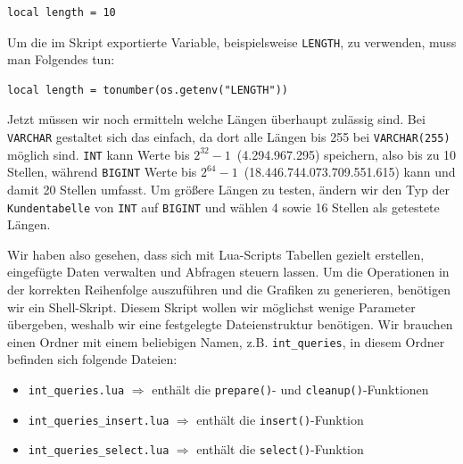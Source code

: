 \vspace{-5pt}
\begin{lstlisting}[language={[5.0]Lua},label={lst:tools-without-imported-length,style=custom_daniel}]
local length = 10
\end{lstlisting}
\vspace{-5pt}

Um die im Skript exportierte Variable, beispielsweise \texttt{LENGTH}, zu verwenden, muss man Folgendes tun:
\vspace{-5pt}
\begin{lstlisting}[language={[5.0]Lua},label={lst:tools-with-imported-length,style=custom_daniel}]
local length = tonumber(os.getenv("LENGTH"))
\end{lstlisting}
\vspace{-5pt}

Jetzt müssen wir noch ermitteln welche Längen überhaupt zulässig sind.
Bei \texttt{VARCHAR} gestaltet sich das einfach, da dort alle Längen bis 255 bei \texttt{VARCHAR(255)} möglich sind.
\texttt{INT} kann Werte bis \(2^{32} - 1\)~(4.294.967.295) speichern, also bis zu 10 Stellen, während \texttt{BIGINT} Werte bis \(2^{64} - 1\)~(18.446.744.073.709.551.615) kann und damit 20 Stellen umfasst.
Um größere Längen zu testen, ändern wir den Typ der \texttt{Kundentabelle} von \texttt{INT} auf \texttt{BIGINT} und wählen 4 sowie 16 Stellen als getestete Längen.

Wir haben also gesehen, dass sich mit Lua-Scripts Tabellen gezielt erstellen, eingefügte Daten verwalten und Abfragen steuern lassen.
Um die Operationen in der korrekten Reihenfolge auszuführen und die Grafiken zu generieren, benötigen wir ein Shell-Skript.
Diesem Skript wollen wir möglichst wenige Parameter übergeben, weshalb wir eine festgelegte Dateienstruktur benötigen.
Wir brauchen einen Ordner mit einem beliebigen Namen, z.B. \texttt{int\_queries}, in diesem Ordner befinden sich folgende Dateien:

\begin{itemize}\label{files_structure}
    \setlength{\itemsep}{-5pt}
    \item \texttt{int\_queries.lua} $\Rightarrow$ enthält die \texttt{prepare()}- und \texttt{cleanup()}-Funktionen
    \item \texttt{int\_queries\_insert.lua} $\Rightarrow$ enthält die \texttt{insert()}-Funktion
    \item \texttt{int\_queries\_select.lua} $\Rightarrow$ enthält die \texttt{select()}-Funktion
\end{itemize}

